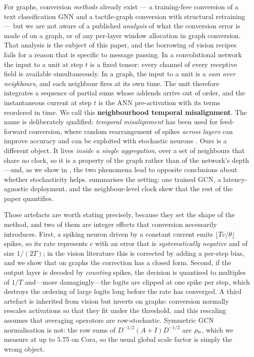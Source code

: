 For graphs, conversion \emph{methods} already exist --- a training-free conversion of a text
classification GNN \citep{hwang2024onespike} and a tactile-graph conversion with structural
retraining \citep{zhang2025quantization} --- but we are not aware of a published \emph{analysis} of what the
conversion error is made of on a graph, or of any per-layer window allocation in graph conversion.
That analysis is
the subject of this paper, and the borrowing of vision recipes fails for a reason that
is specific to message passing. In a convolutional network the input to a unit at step $t$ is a
fixed tensor: every channel of every receptive field is available simultaneously. In a graph, the
input to a unit is a \emph{sum over neighbours}, and each neighbour fires at its own time. The unit
therefore integrates a sequence of partial sums whose addends arrive out of order, and the
instantaneous current at step $t$ is the ANN pre-activation with its terms reordered in time. We
call this \textbf{neighbourhood temporal misalignment}. The name is deliberately qualified:
\emph{temporal misalignment} has been used for feed-forward conversion, where random rearrangement
of spikes \emph{across layers} can improve accuracy and can be exploited with stochastic neurons
\citep{bojkovic2025temporal}. Ours is a different object. It lives \emph{inside a single
aggregation}, over a set of neighbours that share no clock, so it is a property of the graph rather
than of the network's depth---and, as we show in , the two phenomena lead to
opposite conclusions about whether stochasticity helps.  summarises the
setting: one trained GCN, a latency-agnostic deployment, and the neighbour-level clock skew that the
rest of the paper quantifies.

Those artefacts are worth stating precisely, because they set the shape of the method, and two of
them are integer effects that conversion necessarily introduces. First, a spiking neuron driven by a
constant current emits $\lfloor Tc/\theta \rfloor$ spikes, so its rate represents $c$ with an error
that is \emph{systematically negative} and of size $1/(2T)$; in the vision literature this is
corrected by adding a per-step bias, and we show that on graphs the correction has a closed form.
Second, if the output layer is decoded by \emph{counting} spikes, the decision is quantised to
multiples of $1/T$ and---more damagingly---the logits are clipped at one spike per step, which
destroys the ordering of large logits long before the rate has converged. A third artefact is
inherited from vision but inverts on graphs: conversion normally rescales activations so that they
fit under the threshold, and this rescaling assumes that averaging operators are row-stochastic.
Symmetric GCN normalisation is not: the row sums of $D^{-1/2}(A+I)D^{-1/2}$ are $\rho_{n}$, which we
measure at up to $5.75$ on Cora, so the usual global scale factor is simply the wrong object.

